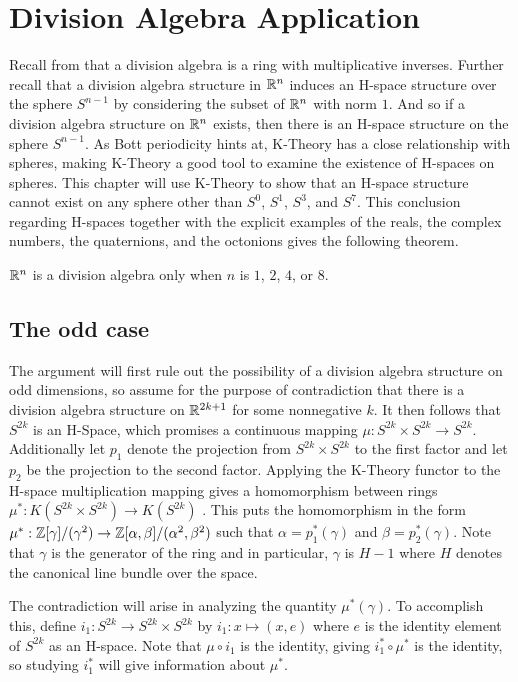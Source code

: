 \documentclass[../sean_thesis.tex]{subfiles}
\begin{document}
\chapter{Division Algebra Application}

Recall from  that a division algebra is a ring with multiplicative inverses. Further recall that a division algebra structure in $\mathbb{R}^n$ induces an H-space structure over the sphere $S^{n-1}$ by considering the subset of $\mathbb{R}^n$ with norm $1$. And so if a division algebra structure on $\mathbb{R}^n$ exists, then there is an H-space structure on the sphere $S^{n-1}$. As Bott periodicity hints at, K-Theory has a close relationship with spheres, making K-Theory a good tool to examine the existence of H-spaces on spheres. This chapter will use K-Theory to show that an H-space structure cannot exist on any sphere other than $S^0$, $S^1$, $S^3$, and $S^7$. This conclusion regarding H-spaces together with the explicit examples of the reals, the complex numbers, the quaternions, and the octonions gives the following theorem.
\begin{theorem}
	$\mathbb{R}^n$ is a division algebra only when $n$ is $1$, $2$, $4$, or $8$.
\end{theorem}

\section{The odd case}
The argument will first rule out the possibility of a division algebra structure on odd dimensions, so assume for the purpose of contradiction that there is a division algebra structure on $\mathbb{R}^{2k+1}$ for some nonnegative $k$. It then follows that $S^{2k}$ is an H-Space, which promises a continuous mapping $\mu: S^{2k} \times S^{2k} \to S^{2k}$. Additionally let $p_1$ denote the projection from $S^{2k} \times S^{2k}$ to the first factor and let $p_2$ be the projection to the second factor. Applying the K-Theory functor to the H-space multiplication mapping gives a homomorphism between rings $\mu^{*}: K(S^{2k} \times S^{2k}) \to K(S^{2k})$ . This puts the homomorphism in the form $\mu^{*}: \mathbb{Z}[\gamma]/(\gamma^2) \to \mathbb{Z}[\alpha, \beta]/(\alpha^{2}, \beta^{2})$ such that $\alpha = p_1^{*}(\gamma)$ and $\beta = p_2^{*}(\gamma)$. Note that $\gamma$ is the generator of the ring and in particular, $\gamma$ is $H-1$ where $H$ denotes the canonical line bundle over the space. 

The contradiction will arise in analyzing the quantity $\mu^{*}(\gamma)$. To accomplish this, define $i_1: S^{2k} \to S^{2k} \times S^{2k}$ by $i_1: x \mapsto (x,e)$ where $e$ is the identity element of $S^{2k}$ as an H-space. Note that $\mu \circ i_1$ is the identity, giving $i_1^{*} \circ \mu^{*}$ is the identity, so studying $i_1^{*}$ will give information about $\mu^{*}$.
\end{document}
